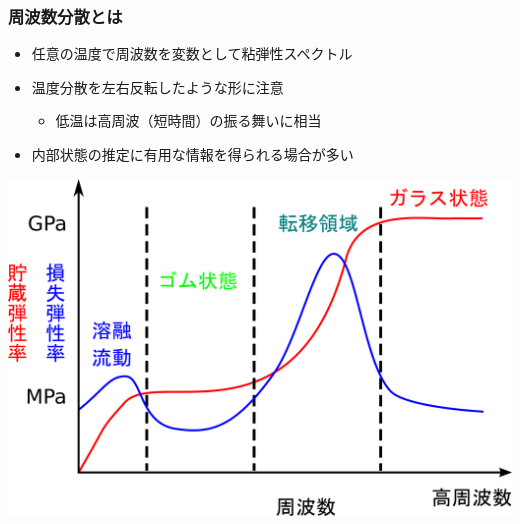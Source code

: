 \documentclass[12pt, dvipdfmx]{beamer}
\begin{document}
\begin{frame}
    \frametitle{周波数分散とは}
		\begin{itemize}
			\item \alert{任意の温度で周波数を変数}として粘弾性スペクトル
			\item \alert{温度分散を左右反転したような形に注意}
					\begin{itemize}
                        \item 低温は高周波（短時間）の振る舞いに相当
                    \end{itemize}
			\item 内部状態の推定に有用な情報を得られる場合が多い
		\end{itemize}

		\vspace{2mm}
		\centering
		\includegraphics[width=.7\textwidth]{dynamic_ViscoElast_Freq.png}
\end{frame}
\end{document}
